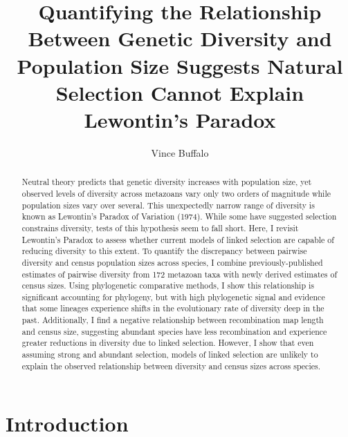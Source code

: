 \documentclass[9pt,lineno]{elife}
\title{Quantifying the Relationship Between Genetic Diversity and Population Size Suggests Natural Selection Cannot Explain Lewontin's Paradox}
\author[1*]{Vince Buffalo}
\affil[1]{Institute of Ecology and Evolution, University of Oregon, United States}
\begin{document}
\maketitle

\begin{abstract}

 Neutral theory predicts that genetic diversity increases with population size,
 yet observed levels of diversity across metazoans vary only two orders of
 magnitude while population sizes vary over several. This unexpectedly narrow
 range of diversity is known as Lewontin's Paradox of Variation (1974). While
 some have suggested selection constrains diversity, tests of this hypothesis
 seem to fall short. Here, I revisit Lewontin's Paradox to assess whether
 current models of linked selection are capable of reducing diversity to this
 extent. To quantify the discrepancy between pairwise diversity and census
 population sizes across species, I combine previously-published estimates of
 pairwise diversity from 172 metazoan taxa with newly derived estimates of
 census sizes.  Using phylogenetic comparative methods, I show this
 relationship is significant accounting for phylogeny, but with high
 phylogenetic signal and evidence that some lineages experience shifts in the
 evolutionary rate of diversity deep in the past. Additionally, I find a
 negative relationship between recombination map length and census size,
 suggesting abundant species have less recombination and experience greater
 reductions in diversity due to linked selection. However, I show that even
 assuming strong and abundant selection, models of linked selection are
 unlikely to explain the observed relationship between diversity and census
 sizes across species.

\end{abstract}


\section{Introduction}
\end{document}
